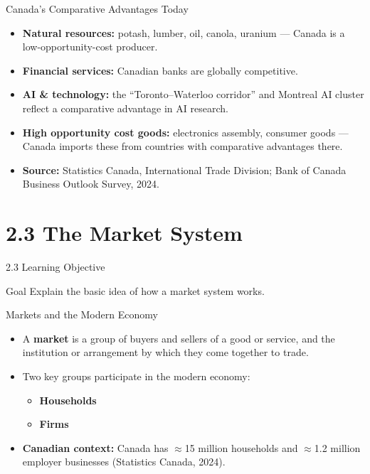 \documentclass[aspectratio=169]{beamer}
\begin{document}
\begin{frame}{Canada's Comparative Advantages Today}
\transfade
\begin{itemize}
  \item \textbf{Natural resources:} potash, lumber, oil, canola, uranium --- Canada is a low-opportunity-cost producer.
  \item \textbf{Financial services:} Canadian banks are globally competitive.
  \item \textbf{AI \& technology:} the ``Toronto--Waterloo corridor'' and Montreal AI cluster reflect a comparative advantage in AI research.
  \item \textbf{High opportunity cost goods:} electronics assembly, consumer goods --- Canada imports these from countries with comparative advantages there.
  \item \textbf{Source:} Statistics Canada, International Trade Division; Bank of Canada Business Outlook Survey, 2024.
\end{itemize}
\end{frame}

\section{2.3 The Market System}

\begin{frame}{2.3 Learning Objective}
\transfade
\begin{block}{Goal}
Explain the basic idea of how a market system works.
\end{block}
\end{frame}

\begin{frame}{Markets and the Modern Economy}
\transfade
\begin{itemize}
  \item A \textbf{market} is a group of buyers and sellers of a good or service, and the institution or arrangement by which they come together to trade.
  \item Two key groups participate in the modern economy:
  \begin{itemize}
    \item \textbf{Households}
    \item \textbf{Firms}
  \end{itemize}
  \item \textbf{Canadian context:} Canada has $\approx$15 million households and $\approx$1.2 million employer businesses (Statistics Canada, 2024).
\end{itemize}
\end{frame}
\end{document}
